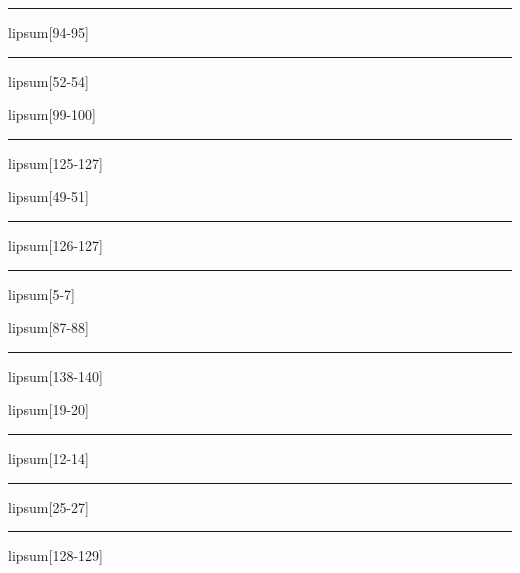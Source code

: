 \documentclass[11pt,a4paper]{article}
\begin{document}
\begin{simplewrap}
  \textcolor{pink!13}{\rule{4.9cm}{9.7cm}}
\end{simplewrap}
lipsum[94-95]

\begin{simplewrap}
  \textcolor{brown!15}{\rule{5.5cm}{8.1cm}}
\end{simplewrap}
lipsum[52-54]

lipsum[99-100]

\begin{simplewrap}
  \textcolor{yellow!29}{\rule{5.1cm}{9.2cm}}
\end{simplewrap}
lipsum[125-127]

lipsum[49-51]

\begin{simplewrap}
  \textcolor{purple!12}{\rule{3.6cm}{7.8cm}}
\end{simplewrap}
lipsum[126-127]

\begin{simplewrap}
  \textcolor{magenta!51}{\rule{3.9cm}{6.3cm}}
\end{simplewrap}
lipsum[5-7]

lipsum[87-88]

\begin{simplewrap}
  \textcolor{blue!35}{\rule{3.4cm}{8.5cm}}
\end{simplewrap}
lipsum[138-140]

lipsum[19-20]

\begin{simplewrap}
  \textcolor{blue!57}{\rule{3.4cm}{7.2cm}}
\end{simplewrap}
lipsum[12-14]

\begin{simplewrap}
  \textcolor{purple!10}{\rule{3.5cm}{2.4cm}}
\end{simplewrap}
lipsum[25-27]

\begin{simplewrap}
  \textcolor{cyan!47}{\rule{3.2cm}{8.5cm}}
\end{simplewrap}
lipsum[128-129]
\end{document}
